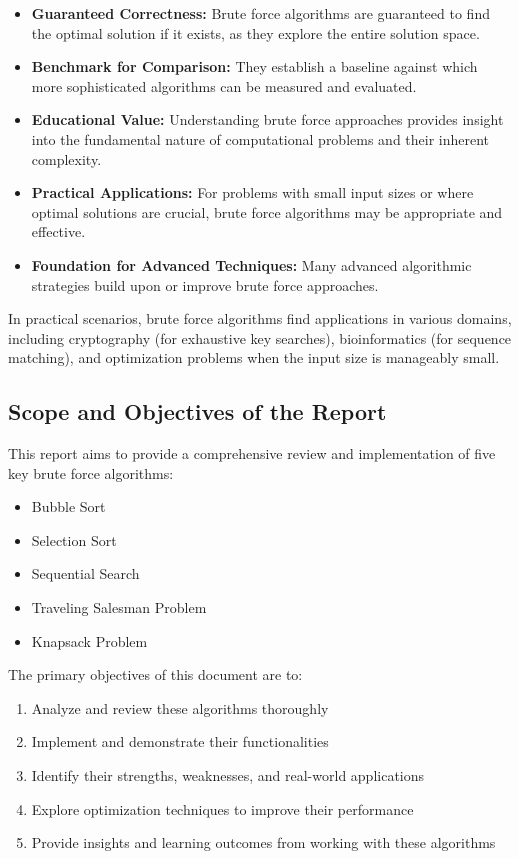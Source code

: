 \documentclass{article}
\begin{document}
\begin{itemize}
    \item \textbf{Guaranteed Correctness:} Brute force algorithms are guaranteed to find the optimal solution if it exists, as they explore the entire solution space.
    \item \textbf{Benchmark for Comparison:} They establish a baseline against which more sophisticated algorithms can be measured and evaluated.
    \item \textbf{Educational Value:} Understanding brute force approaches provides insight into the fundamental nature of computational problems and their inherent complexity.
    \item \textbf{Practical Applications:} For problems with small input sizes or where optimal solutions are crucial, brute force algorithms may be appropriate and effective.
    \item \textbf{Foundation for Advanced Techniques:} Many advanced algorithmic strategies build upon or improve brute force approaches.
\end{itemize}

In practical scenarios, brute force algorithms find applications in various domains, including cryptography (for exhaustive key searches), bioinformatics (for sequence matching), and optimization problems when the input size is manageably small.


\subsection*{Scope and Objectives of the Report}
This report aims to provide a comprehensive review and implementation of five key brute force algorithms:

\begin{itemize}
    \item Bubble Sort
    \item Selection Sort
    \item Sequential Search
    \item Traveling Salesman Problem
    \item Knapsack Problem
\end{itemize}


The primary objectives of this document are to:
\begin{enumerate}
    \item Analyze and review these algorithms thoroughly
    \item Implement and demonstrate their functionalities
    \item Identify their strengths, weaknesses, and real-world applications
    \item Explore optimization techniques to improve their performance
    \item Provide insights and learning outcomes from working with these algorithms
\end{enumerate}
\end{document}
